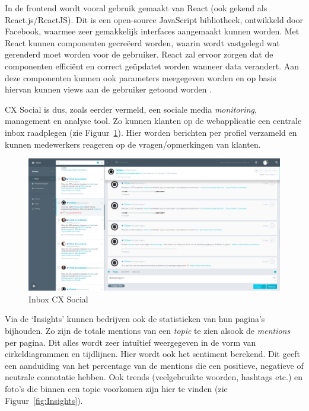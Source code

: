 In de frontend wordt vooral gebruik gemaakt van React (ook gekend als React.js/ReactJS). Dit is een open-source JavaScript bibliotheek, ontwikkeld door Facebook, waarmee zeer gemakkelijk interfaces aangemaakt kunnen worden. Met React kunnen componenten gecre\"{e}erd worden, waarin wordt vastgelegd wat gerenderd moet worden voor de gebruiker. React zal ervoor zorgen dat de componenten effici\"{e}nt en correct ge\"{u}pdatet worden wanneer data verandert. Aan deze componenten kunnen ook parameters meegegeven worden en op basis hiervan kunnen views aan de gebruiker getoond worden \cite{React}. 

CX Social is dus, zoals eerder vermeld, een sociale media \textit{monitoring}, management en analyse tool. Zo kunnen klanten op de webapplicatie een centrale inbox raadplegen (zie Figuur~\ref{fig:Inbox}). Hier worden berichten per profiel verzameld en kunnen medewerkers reageren op de vragen/opmerkingen van klanten. 

\begin{figure}[H]
	\centering
	\includegraphics[width=1\textwidth]{Figuren/Inbox.png}
	\caption{Inbox CX Social \cite{EngagorScreenshots}} %
	\label{fig:Inbox}
\end{figure} 

Via de `Insights' kunnen bedrijven ook de statistieken van hun pagina's bijhouden. Zo zijn de totale mentions van een \textit{topic} te zien alsook de \textit{mentions} per pagina. Dit alles wordt zeer intu\"{i}tief  weergegeven in de vorm van cirkeldiagrammen en tijdlijnen. Hier wordt ook het sentiment berekend. Dit geeft een aanduiding van het percentage van de mentions die een positieve, negatieve of neutrale connotatie hebben. Ook trends (veelgebruikte woorden, hashtags  etc.) en foto's die binnen een topic voorkomen zijn hier te vinden (zie Figuur~\ref{fig:Insights}).  

